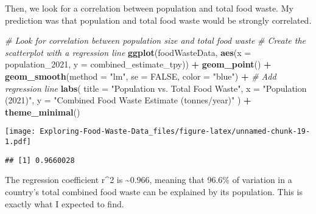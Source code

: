 \documentclass[
]{article}
\newenvironment{Shaded}{\begin{snugshade}}{\end{snugshade}}
\newcommand{\AttributeTok}[1]{\textcolor[rgb]{0.13,0.29,0.53}{#1}}
\newcommand{\CommentTok}[1]{\textcolor[rgb]{0.56,0.35,0.01}{\textit{#1}}}
\newcommand{\ConstantTok}[1]{\textcolor[rgb]{0.56,0.35,0.01}{#1}}
\newcommand{\FunctionTok}[1]{\textcolor[rgb]{0.13,0.29,0.53}{\textbf{#1}}}
\newcommand{\NormalTok}[1]{#1}
\newcommand{\OtherTok}[1]{\textcolor[rgb]{0.56,0.35,0.01}{#1}}
\newcommand{\SpecialCharTok}[1]{\textcolor[rgb]{0.81,0.36,0.00}{\textbf{#1}}}
\newcommand{\StringTok}[1]{\textcolor[rgb]{0.31,0.60,0.02}{#1}}
\begin{document}
Then, we look for a correlation between population and total food waste.
My prediction was that population and total food waste would be strongly
correlated.

\begin{Shaded}
\begin{Highlighting}[]
\CommentTok{\# Look for correlation between population size and total food waste}
\CommentTok{\# Create the scatterplot with a regression line}
\FunctionTok{ggplot}\NormalTok{(foodWasteData, }\FunctionTok{aes}\NormalTok{(}\AttributeTok{x =}\NormalTok{ population\_2021, }\AttributeTok{y =}\NormalTok{ combined\_estimate\_tpy)) }\SpecialCharTok{+}
  \FunctionTok{geom\_point}\NormalTok{() }\SpecialCharTok{+}
  \FunctionTok{geom\_smooth}\NormalTok{(}\AttributeTok{method =} \StringTok{"lm"}\NormalTok{, }\AttributeTok{se =} \ConstantTok{FALSE}\NormalTok{, }\AttributeTok{color =} \StringTok{"blue"}\NormalTok{) }\SpecialCharTok{+}  \CommentTok{\# Add regression line}
  \FunctionTok{labs}\NormalTok{(}
    \AttributeTok{title =} \StringTok{"Population vs. Total Food Waste"}\NormalTok{,}
    \AttributeTok{x =} \StringTok{"Population (2021)"}\NormalTok{,}
    \AttributeTok{y =} \StringTok{"Combined Food Waste Estimate (tonnes/year)"}
\NormalTok{  ) }\SpecialCharTok{+}
  \FunctionTok{theme\_minimal}\NormalTok{()}
\end{Highlighting}
\end{Shaded}

\texttt{[image: Exploring-Food-Waste-Data\_files/figure-latex/unnamed-chunk-19-1.pdf]}

\begin{Shaded}
\end{Shaded}

\begin{verbatim}
## [1] 0.9660028
\end{verbatim}

The regression coefficient r\^{}2 is \textasciitilde0.966, meaning that
96.6\% of variation in a country's total combined food waste can be
explained by its population. This is exactly what I expected to find.
\end{document}
